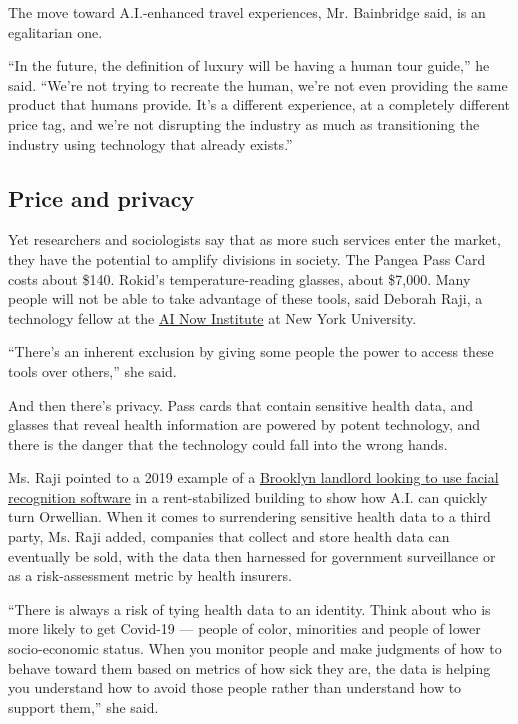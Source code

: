 The move toward A.I.-enhanced travel experiences, Mr. Bainbridge said,
is an egalitarian one.

``In the future, the definition of luxury will be having a human tour
guide,'' he said. ``We're not trying to recreate the human, we're not
even providing the same product that humans provide. It's a different
experience, at a completely different price tag, and we're not
disrupting the industry as much as transitioning the industry using
technology that already exists.''

\hypertarget{price-and-privacy}{%
\subsection{Price and privacy}\label{price-and-privacy}}

Yet researchers and sociologists say that as more such services enter
the market, they have the potential to amplify divisions in society. The
Pangea Pass Card costs about \$140. Rokid's temperature-reading glasses,
about \$7,000. Many people will not be able to take advantage of these
tools, said Deborah Raji, a technology fellow at the
\href{https://ainowinstitute.org/}{AI Now Institute} at New York
University.

``There's an inherent exclusion by giving some people the power to
access these tools over others,'' she said.

And then there's privacy. Pass cards that contain sensitive health data,
and glasses that reveal health information are powered by potent
technology, and there is the danger that the technology could fall into
the wrong hands.

Ms. Raji pointed to a 2019 example of a
\href{https://www.nytimes3xbfgragh.onion/2019/03/28/nyregion/rent-stabilized-buildings-facial-recognition.html}{Brooklyn
landlord looking to use facial recognition software} in a
rent-stabilized building to show how A.I. can quickly turn Orwellian.
When it comes to surrendering sensitive health data to a third party,
Ms. Raji added, companies that collect and store health data can
eventually be sold, with the data then harnessed for government
surveillance or as a risk-assessment metric by health insurers.

``There is always a risk of tying health data to an identity. Think
about who is more likely to get Covid-19 --- people of color, minorities
and people of lower socio-economic status. When you monitor people and
make judgments of how to behave toward them based on metrics of how sick
they are, the data is helping you understand how to avoid those people
rather than understand how to support them,'' she said.


